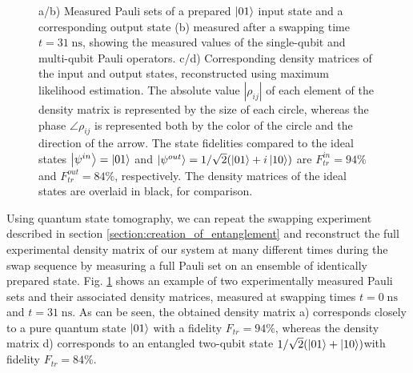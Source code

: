 \begin{figure}[ht!]
\begin{tabular}{ll}
	\end{tabular}
	\caption[]{a/b) Measured Pauli sets of a prepared $\left| 01 \right>$ input state and a corresponding output state (b) measured after a swapping time $t=31\;\mathrm{ns}$, showing the measured values of the single-qubit and multi-qubit Pauli operators. c/d) Corresponding density matrices of the input and output states, reconstructed using maximum likelihood estimation. The absolute value $|\rho_{ij}|$ of each element of the density matrix is represented by the size of each circle, whereas the phase $\angle \rho_{ij}$ is represented both by the color of the circle and the direction of the arrow. The state fidelities compared to the ideal states $\left| \psi^{in} \right>=\left| 01 \right>$ and $\left| \psi^{out} \right>=1/\sqrt{2}(\left| 01 \right>+i\left| 10 \right>)$ are $F^{in}_{tr}=94\%$ and $F^{out}_{tr}=84\%$, respectively. The density matrices of the ideal states are overlaid in black, for comparison.}
	\label{fig:pauli_set_example}
\end{figure}

Using quantum state tomography, we can repeat the swapping experiment described in section \ref{section:creation_of_entanglement} and reconstruct the full experimental density matrix of our system at many different times during the swap sequence by measuring a full Pauli set on an ensemble of identically prepared state. Fig. \ref{fig:pauli_set_example} shows an example of two experimentally measured Pauli sets and their associated density matrices, measured at swapping times $t=0\;\mathrm{ns}$ and $t= 31\;\mathrm{ns}$. As can be seen, the obtained density matrix a) corresponds closely to a pure quantum state $\left| 01 \right>$ with a fidelity $F_{tr}=94\%$, whereas the density matrix d) corresponds to an entangled two-qubit state $1/\sqrt{2}(\left| 01 \right>+\left| 10 \right>)$with fidelity $F_{tr}=84\%$. 

\smallskip


